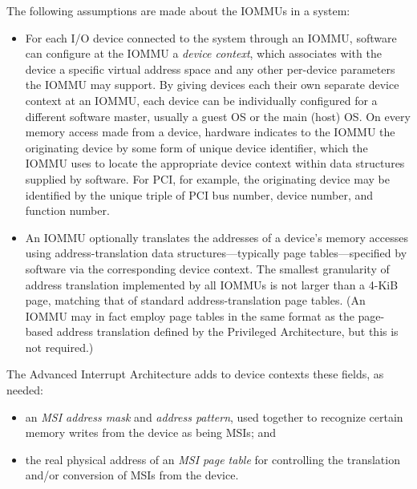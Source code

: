 The following assumptions are made about the \mbox{IOMMU}s in a system:
\begin{itemize}

\item
For each I/O device connected to the system through an \mbox{IOMMU},
software can configure at the \mbox{IOMMU} a \emph{device context}, which
associates with the device a specific virtual address space and any
other per-device parameters the \mbox{IOMMU} may support.
By giving devices each their own separate device context at an \mbox{IOMMU},
each device can be individually configured for a different software
master, usually a guest OS or the main (host) OS.
On every memory access made from a device, hardware indicates to
the \mbox{IOMMU} the originating device by some form of unique device
identifier, which the \mbox{IOMMU} uses to locate the appropriate device
context within data structures supplied by software.
For PCI, for example, the originating device may be identified by the
unique triple of PCI bus number, device number, and function number.

\item
An \mbox{IOMMU} optionally translates the addresses of a device's memory
accesses using address-translation data structures---typically page
tables---specified by software via the corresponding device context.
The smallest granularity of address translation implemented by all
\mbox{IOMMU}s is not larger than a \mbox{4-KiB} page, matching that of
standard {\RISCV} address-translation page tables.
(An \mbox{IOMMU} may in fact employ page tables in the same format as the
page-based address translation defined by the {\RISCV} Privileged
Architecture, but this is not required.)

\end{itemize}

The Advanced Interrupt Architecture adds to device contexts these
fields, as needed:
\begin{itemize}

\item
an \emph{MSI address mask} and \emph{address pattern}, used together to
recognize certain memory writes from the device as being MSIs; and

\item
the real physical address of an \emph{MSI page table} for controlling
the translation and/or conversion of MSIs from the device.

\end{itemize}

